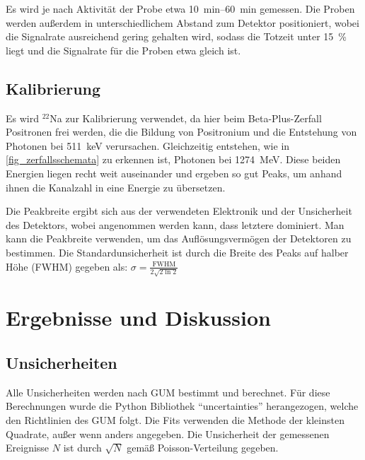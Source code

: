\documentclass[
	a4paper,
	12pt,
	pagesize,
	ngerman
]{scrartcl}
\begin{document}
	Es wird je nach Aktivität der Probe etwa \SIrange{10}{60}{\minute} gemessen.
	Die Proben werden außerdem in unterschiedlichem Abstand zum Detektor positioniert, wobei die Signalrate ausreichend gering gehalten wird, sodass die Totzeit unter \SI{15}{\percent} liegt und die Signalrate für die Proben etwa gleich ist.

	\subsection{Kalibrierung}

	Es wird $^{22}$Na zur Kalibrierung verwendet, da hier beim Beta-Plus-Zerfall Positronen frei werden, die die Bildung von Positronium und die Entstehung von Photonen bei \SI{511}{keV} verursachen.
	Gleichzeitig entstehen, wie in \cref{fig_zerfallsschemata} zu erkennen ist, Photonen bei \SI{1274}{MeV}.
	Diese beiden Energien liegen recht weit auseinander und ergeben so gut Peaks, um anhand ihnen die Kanalzahl in eine Energie zu übersetzen.

	Die Peakbreite ergibt sich aus der verwendeten Elektronik und der Unsicherheit des Detektors, wobei angenommen werden kann, dass letztere dominiert.
	Man kann die Peakbreite verwenden, um das Auflösungsvermögen der Detektoren zu bestimmen.
	Die Standardunsicherheit ist durch die Breite des Peaks auf halber Höhe (FWHM) gegeben als: $\sigma = \frac{\text{FWHM}}{2\sqrt{2 \ln 2}}$

	\section{Ergebnisse und Diskussion}



	\subsection{Unsicherheiten}
	Alle Unsicherheiten werden nach GUM bestimmt und berechnet.
	Für diese Berechnungen wurde die Python Bibliothek \enquote{uncertainties} herangezogen, welche den Richtlinien des GUM folgt.
	Die Fits verwenden die Methode der kleinsten Quadrate, außer wenn anders angegeben.
	Die Unsicherheit der gemessenen Ereignisse $N$ ist durch $\sqrt{N}$ gemäß Poisson-Verteilung gegeben.
\end{document}
